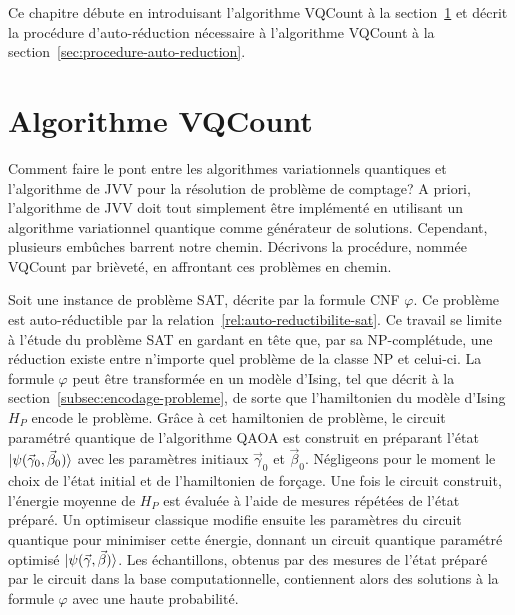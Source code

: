 Ce chapitre débute en introduisant l'algorithme VQCount à la section~\ref{sec:algorithme-vqcount} et décrit la procédure d'auto-réduction nécessaire à l'algorithme VQCount à la section~\ref{sec:procedure-auto-reduction}.


\section{Algorithme VQCount}
\label{sec:algorithme-vqcount}

Comment faire le pont entre les algorithmes variationnels quantiques et l'algorithme de JVV pour la résolution de problème de comptage? A priori, l'algorithme de JVV doit tout simplement être implémenté en utilisant un algorithme variationnel quantique comme générateur de solutions. Cependant, plusieurs embûches barrent notre chemin. Décrivons la procédure, nommée VQCount par brièveté, en affrontant ces problèmes en chemin.

Soit une instance de problème SAT, décrite par la formule CNF $\varphi$. Ce problème est auto-réductible par la relation~\ref{rel:auto-reductibilite-sat}. Ce travail se limite à l'étude du problème SAT en gardant en tête que, par sa \textsf{NP}-complétude, une réduction existe entre n'importe quel problème de la classe \textsf{NP} et celui-ci. La formule $\varphi$ peut être transformée en un modèle d'Ising, tel que décrit à la section~\ref{subsec:encodage-probleme}, de sorte que l'hamiltonien du modèle d'Ising $H_{P}$ encode le problème. Grâce à cet hamiltonien de problème, le circuit paramétré quantique de l'algorithme QAOA est construit en préparant l'état $\ket{\psi(\vec{\gamma}_{0}, \vec{\beta}_{0})}$ avec les paramètres initiaux $\vec{\gamma}_0$ et $\vec{\beta}_{0}$. Négligeons pour le moment le choix de l'état initial et de l'hamiltonien de forçage. Une fois le circuit construit, l'énergie moyenne de $H_{P}$ est évaluée à l'aide de mesures répétées de l'état préparé. Un optimiseur classique modifie ensuite les paramètres du circuit quantique pour minimiser cette énergie, donnant un circuit quantique paramétré optimisé $\ket{\psi(\vec{\gamma}, \vec{\beta})}$.
Les échantillons, obtenus par des mesures de l'état préparé par le circuit dans la base computationnelle, contiennent alors des solutions à la formule $\varphi$ avec une haute probabilité.

